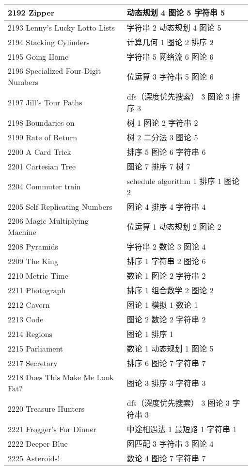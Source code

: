 \begin{longtable}{| p{} | p{} |}
 2192 Zipper  & 动态规划 4 图论 5 字符串 5 \\ \hline
 2193 Lenny's Lucky Lotto Lists  & 字符串 2 动态规划 4 图论 5 \\ \hline
 2194 Stacking Cylinders  & 计算几何 1 图论 2 排序 2 \\ \hline
 2195 Going Home  & 字符串 5 网络流 6 图论 6 \\ \hline
 2196 Specialized Four-Digit Numbers  & 位运算 3 字符串 5 图论 6 \\ \hline
 2197 Jill's Tour Paths  & dfs（深度优先搜索） 3 图论 3 排序 3 \\ \hline
 2198 Boundaries on  & 树 1 图论 2 字符串 2 \\ \hline
 2199 Rate of Return  & 树 2 二分法 3 图论 5 \\ \hline
 2200 A Card Trick  & 排序 5 图论 6 字符串 6 \\ \hline
 2201 Cartesian Tree  & 图论 7 排序 7 树 7 \\ \hline
 2204 Commuter train  & schedule algorithm 1 排序 1 图论 2 \\ \hline
 2205 Self-Replicating Numbers  & 图论 4 排序 4 字符串 4 \\ \hline
 2206 Magic Multiplying Machine  & 位运算 1 动态规划 2 图论 2 \\ \hline
 2208 Pyramids  & 字符串 2 数论 3 图论 4 \\ \hline
 2209 The King  & 排序 1 字符串 2 图论 6 \\ \hline
 2210 Metric Time  & 数论 1 图论 2 字符串 2 \\ \hline
 2211 Photograph  & 排序 1 组合数学 2 图论 2 \\ \hline
 2212 Cavern  & 图论 1 模拟 1 数论 1 \\ \hline
 2213 Code  & 图论 2 数论 2 字符串 2 \\ \hline
 2214 Regions  & 图论 1 排序 1 \\ \hline
 2215 Parliament  & 数论 1 动态规划 1 图论 5 \\ \hline
 2217 Secretary  & 排序 6 图论 7 字符串 7 \\ \hline
 2218 Does This Make Me Look Fat?  & 图论 3 排序 3 字符串 3 \\ \hline
 2220 Treasure Hunters  & dfs（深度优先搜索） 3 图论 3 字符串 3 \\ \hline
 2221 Frogger's For Dinner  & 中途相遇法 1 最短路 1 字符串 1 \\ \hline
 2222 Deeper Blue  & 图匹配 3 字符串 3 图论 4 \\ \hline
 2225 Asteroids!  & 数论 4 图论 7 字符串 7 \\ \hline

\end{longtable}
